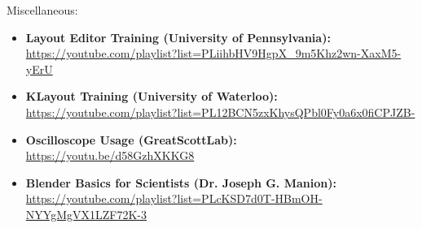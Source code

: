 \begin{flushleft}
\large Miscellaneous:
\end{flushleft}

\normalsize\begin{itemize}

  \item\textbf{Layout Editor Training (University of Pennsylvania):}\\
\url{https://youtube.com/playlist?list=PLiihbHV9HgpX_9m5Khz2wn-XaxM5-yErU}

  \item\textbf{KLayout Training (University of Waterloo):}\\
\url{https://youtube.com/playlist?list=PL12BCN5zxKhysQPbl0Fy0a6x0fiCPJZB-}

  \item\textbf{Oscilloscope Usage (GreatScottLab):}\\
\url{https://youtu.be/d58GzhXKKG8}

  \item\textbf{Blender Basics for Scientists (Dr. Joseph G. Manion):}\\
\url{https://youtube.com/playlist?list=PLcKSD7d0T-HBmOH-NYYgMgVX1LZF72K-3}\\

\end{itemize}
